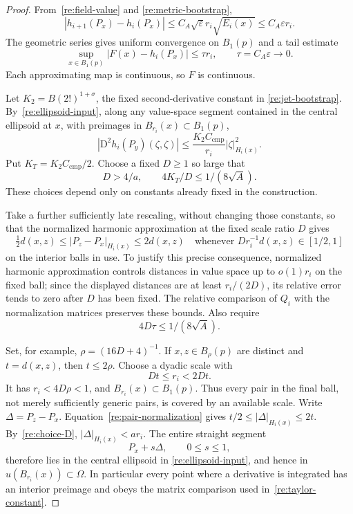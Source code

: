 \begin{proof}
From~\eqref{re:field-value} and
\eqref{re:metric-bootstrap},
\[
 |h_{i+1}(P_x)-h_i(P_x)|
       \le C_A\sqrt\varepsilon r_i\sqrt{E_i(x)}
       \le C_A\varepsilon r_i.
\]
The geometric series gives uniform convergence on $B_1(p)$ and a
tail estimate
\begin{equation}
 \label{re:uniform-tail}
 \sup_{x\in B_1(p)}|F(x)-h_i(P_x)|\le\tau r_i,
 \qquad \tau=C_A\varepsilon\longrightarrow0.
\end{equation}
Each approximating map is continuous, so $F$ is continuous.

Let $K_2=B(2!)^{1+\sigma}$, the fixed second-derivative constant in
\eqref{re:jet-bootstrap}.  By~\eqref{re:ellipsoid-input}, along
any value-space segment contained in the central ellipsoid at $x$,
with preimages in $B_{r_i}(x)\subset B_1(p)$,
\begin{equation}
 \label{re:taylor-constant}
 |\mathrm D^2h_i(P_y)(\zeta,\zeta)|
       \le\frac{K_2C_{\mathrm{cmp}}}{r_i}
                         |\zeta|_{H_i(x)}^2.
\end{equation}
Put $K_T=K_2C_{\mathrm{cmp}}/2$.  Choose a fixed $D\ge1$ so large
that
\begin{equation}
 \label{re:choice-D}
 D>4/a,\qquad 4K_T/D\le1/(8\sqrt A).
\end{equation}
These choices depend only on constants already fixed in the
construction.

Take a further sufficiently late rescaling, without changing those
constants, so that the normalized harmonic approximation at the
fixed scale ratio $D$ gives
\begin{equation}
 \label{re:pair-normalization}
 \tfrac12 d(x,z)\le|P_z-P_x|_{H_i(x)}\le2d(x,z)
 \quad\text{whenever }Dr_i^{-1}d(x,z)\in[1/2,1]
\end{equation}
on the interior balls in use.  To justify this precise consequence,
normalized harmonic approximation controls distances in value space
up to $o(1)r_i$ on the fixed ball; since the displayed distances are
at least $r_i/(2D)$, its relative error tends to zero after $D$ has
been fixed.  The relative comparison of $Q_i$ with the normalization
matrices preserves these bounds.  Also require
\begin{equation}
 \label{re:choice-tail}
 4D\tau\le1/(8\sqrt A).
\end{equation}

Set, for example, $\rho=(16D+4)^{-1}$.  If $x,z\in B_\rho(p)$
are distinct and $t=d(x,z)$, then $t\le2\rho$.  Choose a dyadic
scale with
\[
 Dt\le r_i<2Dt.
\]
It has $r_i<4D\rho<1$, and
$B_{r_i}(x)\subset B_1(p)$.  Thus every pair in the final ball,
not merely sufficiently generic pairs, is covered by an available
scale.  Write $\Delta=P_z-P_x$.  Equation~\eqref{re:pair-normalization}
gives $t/2\le|\Delta|_{H_i(x)}\le2t$.
By~\eqref{re:choice-D}, $|\Delta|_{H_i(x)}<a r_i$.
The entire straight segment
\[
 P_x+s\Delta,\qquad 0\le s\le1,
\]
therefore lies in the central ellipsoid in
\eqref{re:ellipsoid-input}, and hence in
$u(B_{r_i}(x))\subset\Omega$.  In particular every point where a
derivative is integrated has an interior preimage and obeys the
matrix comparison used in~\eqref{re:taylor-constant}.


\end{proof}
